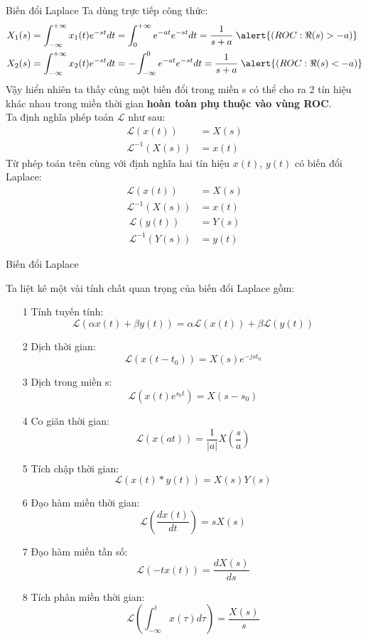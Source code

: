 \documentclass[8pt]{beamer}
\begin{document}
\begin{frame}{Biến đổi Laplace}
Ta dùng trực tiếp công thức:
\begin{equation*}
\begin{split}
	X_{1}(s)&=\int_{-\infty}^{+\infty}x_{1}(t)e^{-st}dt=\int_{0}^{+\infty}e^{-at}e^{-st}dt=\frac{1}{s+a} \; \alert{(ROC: \Re{(s)}>-a)}\\
X_{2}(s)&=\int_{-\infty}^{+\infty}x_{2}(t)e^{-st}dt=-\int_{-\infty}^{0}e^{-at}e^{-st}dt=\frac{1}{s+a} \; \alert{(ROC: \Re{(s)}<-a)}
\end{split}
\end{equation*}
Vậy hiển nhiên ta thấy cùng một biến đổi trong miền s có thể cho ra 2 tín hiệu khác nhau trong miền thời gian \textbf{hoàn toàn phụ thuộc vào vùng ROC}.
\\ Ta định nghĩa phép toán $\mathscr{L}$ như sau:
\begin{equation*}
\begin{split}
	\mathscr{L}(x(t))&=X(s)\\
	\mathscr{L}^{-1}(X(s))&=x(t)
\end{split}
\end{equation*}
Từ phép toán trên cùng với định nghĩa hai tín hiệu $x(t)$, $y(t)$ có biến đổi Laplace:
\begin{equation*}
\begin{split}
	\mathscr{L}(x(t))&=X(s)\\
	\mathscr{L}^{-1}(X(s))&=x(t)
\end{split}
\end{equation*}
\begin{equation*}
\begin{split}
	\mathscr{L}(y(t))&=Y(s)\\
	\mathscr{L}^{-1}(Y(s))&=y(t)
\end{split}
\end{equation*}
\end{frame}
\begin{frame}{Biến đổi Laplace}

Ta liệt kê một vài tính chất quan trọng của biến đổi Laplace gồm:
\begin{enumerate}
	\item[1] Tính tuyến tính: $$\mathscr{L}(\alpha x(t)+\beta y(t))=\alpha\mathscr{L}(x(t))+\beta\mathscr{L}(y(t))$$
	\item[2] Dịch thời gian: $$\mathscr{L}(x(t-t_{0}))=X(s)e^{-jst_{0}}$$
	\item[3] Dịch trong miền s: $$\mathscr{L}(x(t)e^{s_{0}t})=X(s-s_{0})$$
	\item[4] Co giãn thời gian: $$\mathscr{L}(x(at))=\frac{1}{|a|}X\left(\frac{s}{a}\right)$$
	\item[5] Tích chập thời gian: $$\mathscr{L}(x(t)*y(t))=X(s)Y(s)$$
	\item[6] Đạo hàm miền thời gian: $$\mathscr{L}\left(\frac{dx(t)}{dt}\right)=sX(s)$$
	\item[7] Đạo hàm miền tần số: $$\mathscr{L}(-tx(t))=\frac{dX(s)}{ds}$$
	\item[8] Tích phân miền thời gian: $$\mathscr{L}\left(\int_{-\infty}^{t}x(\tau)d\tau\right)=\frac{X(s)}{s}$$
\end{enumerate}
\end{frame}
\end{document}
